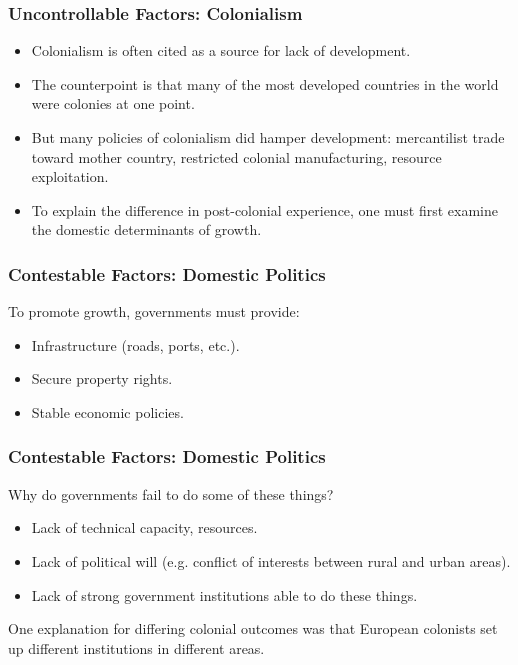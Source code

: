 \documentclass[handout]{beamer}
\begin{document}
\begin{frame} 
\frametitle{\LARGE{Uncontrollable Factors: Colonialism}}
\begin{itemize}
		\item Colonialism is often cited as a source for lack of development. \pause
		\item The counterpoint is that many of the most developed countries in the world were colonies at one point. \pause
		\item But many policies of colonialism did hamper development: mercantilist trade toward mother country, restricted colonial manufacturing, resource exploitation. \pause
		\item To explain the difference in post-colonial experience, one must first examine the domestic determinants of growth.
\end{itemize}
\end{frame}

\begin{frame} 
\frametitle{\LARGE{Contestable Factors: Domestic Politics}}
\begin{itemize}
	\large{
		\item To promote growth, governments must provide: \pause
		\begin{itemize}
		    \item Infrastructure (roads, ports, etc.). \pause 
		    \item Secure property rights. \pause 
		    \item Stable economic policies.  
		\end{itemize}
	}
\end{itemize}
\end{frame}

\begin{frame} 
	\frametitle{\LARGE{Contestable Factors: Domestic Politics}}
	\begin{itemize}
		\large{
			\item Why do governments fail to do some of these things? \pause 
			\begin{itemize}
				\item Lack of technical capacity, resources. \pause 
				\item Lack of political will (e.g. conflict of interests between rural and urban areas). \pause
				\item Lack of strong government institutions able to do these things.
			\end{itemize}
			\item One explanation for differing colonial outcomes was that European colonists set up different institutions in different areas.
		}
	\end{itemize}
\end{frame}
\end{document}
